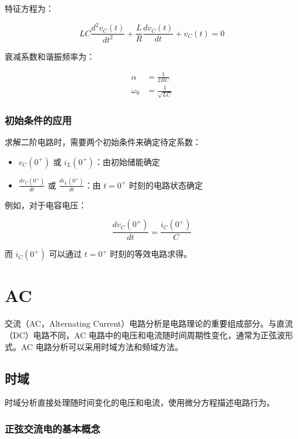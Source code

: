特征方程为：

\begin{equation}
LC \frac{d^2v_C(t)}{dt^2} + \frac{L}{R} \frac{dv_C(t)}{dt} + v_C(t) = 0 \label{eq:rlc-parallel-de}
\end{equation}

衰减系数和谐振频率为：

\begin{align}
\alpha &= \frac{1}{2RC} \\
\omega_0 &= \frac{1}{\sqrt{LC}}
\end{align}

\subsubsection{初始条件的应用}

求解二阶电路时，需要两个初始条件来确定待定系数：
\begin{itemize}
  \item $v_C(0^+)$ 或 $i_L(0^+)$：由初始储能确定
  \item $\frac{dv_C(0^+)}{dt}$ 或 $\frac{di_L(0^+)}{dt}$：由 $t=0^+$ 时刻的电路状态确定
\end{itemize}

例如，对于电容电压：

\begin{equation}
\frac{dv_C(0^+)}{dt} = \frac{i_C(0^+)}{C}
\end{equation}

而 $i_C(0^+)$ 可以通过 $t=0^+$ 时刻的等效电路求得。

\section{AC}

交流（AC，Alternating Current）电路分析是电路理论的重要组成部分。与直流（DC）电路不同，AC 电路中的电压和电流随时间周期性变化，通常为正弦波形式。AC 电路分析可以采用时域方法和频域方法。

\subsection{时域}

时域分析直接处理随时间变化的电压和电流，使用微分方程描述电路行为。

\subsubsection{正弦交流电的基本概念}

